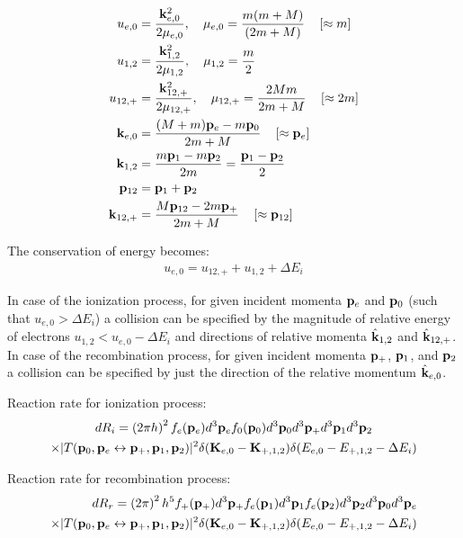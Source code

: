 \documentclass{article}[draft]
\begin{document}
\begin{align*}
u_{e,0} &= \frac{\mathbf{k}_{e,0}^2}{2\mu_{e,0}}, \quad \mu_{e,0} = \frac{m(m+M)}{(2m+M)}
\quad \left[ \approx m \right]
\\
u_{1,2} & = \frac{\mathbf{k}_{1,2}^2}{2\mu_{1,2}}, \quad \mu_{1,2} = \frac{m}{2}
\\
u_{12,+} & = \frac{\mathbf{k}_{12,+}^2}{2\mu_{12,+}}, \quad \mu_{12,+} = \frac{2Mm}{2m+M}
\quad \left[ \approx 2 m \right]
\\
\mathbf{k}_{e,0} &= \frac{(M+m) \mathbf{p}_e - m \mathbf{p}_0}{2m+M} 
\quad \left[ \approx \mathbf{p}_{e} \right]
\\
\mathbf{k}_{1,2} &= \frac{m \mathbf{p}_1 - m \mathbf{p}_2}{2m} = \frac{\mathbf{p}_1 - \mathbf{p}_2}{2}
\\
\mathbf{p}_{12} &= \mathbf{p}_1 + \mathbf{p}_2
\\
\mathbf{k}_{12,+} &= \frac{M \mathbf{p}_{12} - 2m \mathbf{p}_+}{2m+M} 
\quad \left[ \approx \mathbf{p}_{12} \right]
\end{align*}

 The conservation of energy becomes:
\begin{align*}
u_{e,0} = u_{12,+} + u_{1,2} + \Delta E_i
\end{align*}

In case of the ionization process, for given incident momenta $\mathbf{p}_e$ and $\mathbf{p}_0$ (such that $u_{e,0} > \Delta E_i$) a collision can be specified by the magnitude of relative energy of electrons $u_{1,2} < u_{e,0} -\Delta E_i$ and directions of relative momenta $\hat{\mathbf{k}}_{1,2}$ and $\hat{\mathbf{k}}_{12,+}$. In case of the recombination process, for given incident momenta $\mathbf{p}_+$, $\mathbf{p}_1$, and $\mathbf{p}_2$ a collision can be specified by just the direction of the relative momentum $\hat{\mathbf{k}}_{e,0}$.

Reaction rate for ionization process:
\begin{multline*}
d R_i = \left( 2 \pi \planck \right)^2 
f_e\of{\vect{p}_e} d^3 \vect{p}_e f_0\of{\vect{p}_0} d^3 \vect{p}_0
d^3 \vect{p}_+ d^3 \vect{p}_1 d^3 \vect{p}_2
\\
\times
| T\of{\vect{p}_0, \vect{p}_e \leftrightarrow \vect{p}_+, \vect{p}_1, \vect{p}_2} |^2
\delta\of{\vect{K}_{e,0} - \vect{K}_{+,1,2}} 
\delta\of{E_{e,0} - E_{+,1,2} - \Delta E_i}
\end{multline*}

Reaction rate for recombination process:
\begin{align*}
d R_r = \left( 2 \pi  \right)^2 \planck^5
f_+\of{\vect{p}_+} d^3 \vect{p}_+ f_e\of{\vect{p}_1} d^3 \vect{p}_1  f_e\of{\vect{p}_2} d^3 \vect{p}_2 
d^3 \vect{p}_0 d^3 \vect{p}_e
\\
\times
| T\of{\vect{p}_0, \vect{p}_e \leftrightarrow \vect{p}_+, \vect{p}_1, \vect{p}_2} |^2
\delta\of{\vect{K}_{e,0} - \vect{K}_{+,1,2}} 
\delta\of{E_{e,0} - E_{+,1,2} - \Delta E_i}
\end{align*}
\end{document}
